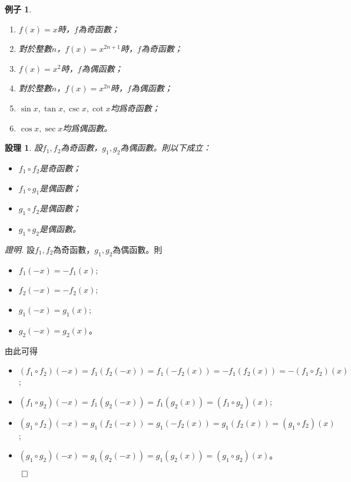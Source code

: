 \documentclass[12pt]{article}
\newtheorem*{proposition}{設理}
\newtheorem*{example}{例子}
\renewenvironment*{proof}{\textit{證明.}}{\hfill$\qed$}
\begin{document}
    \begin{example}
        \begin{enumerate}
            \item $f(x)=x$時，$f$為奇函數；
            \item 對於整數$n$，$f(x)=x^{2n+1}$時，$f$為奇函數；
            \item $f(x)=x^2$時，$f$為偶函數；
            \item 對於整數$n$，$f(x)=x^{2n}$時，$f$為偶函數；
            \item $\sin{x},\tan{x},\csc{x},\cot{x}$均爲奇函數；
            \item $\cos{x},\sec{x}$均爲偶函數。
        \end{enumerate}
    \end{example}

    \begin{proposition}
        設$f_1,f_2$為奇函數，$g_1,g_2$為偶函數。則以下成立：\begin{itemize}
            \item $f_1\circ f_2$是奇函數；
            \item $f_1\circ g_1$是偶函數；
            \item $g_1\circ f_2$是偶函數；
            \item $g_1\circ g_2$是偶函數。
        \end{itemize}
    \end{proposition}

    \begin{proof}
        設$f_1,f_2$為奇函數，$g_1,g_2$為偶函數。則\begin{itemize}
            \item $f_1(-x)=-f_1(x)$;
            \item $f_2(-x)=-f_2(x)$;
            \item $g_1(-x)=g_1(x)$;
            \item $g_2(-x)=g_2(x)$。
        \end{itemize}
        由此可得\begin{itemize}
            \item $(f_1\circ f_2)(-x)=f_1(f_2(-x))=f_1(-f_2(x))=-f_1(f_2(x))=-(f_1\circ f_2)(x)$;
            \item $(f_1\circ g_2)(-x)=f_1(g_2(-x))=f_1(g_2(x))=(f_1\circ g_2)(x)$;
            \item $(g_1\circ f_2)(-x)=g_1(f_2(-x))=g_1(-f_2(x))=g_1(f_2(x))=(g_1\circ f_2)(x)$;
            \item $(g_1\circ g_2)(-x)=g_1(g_2(-x))=g_1(g_2(x))=(g_1\circ g_2)(x)$。
        \end{itemize}
    \end{proof}
\end{document}
